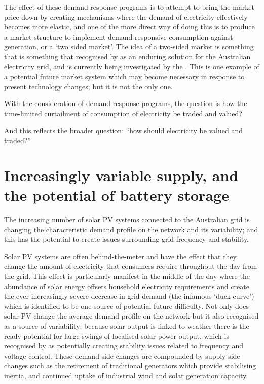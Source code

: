 The effect of these demand-response programs is to attempt to bring the market price down by creating mechanisms where the demand of electricity effectively becomes more elastic, and one of the more direct way of doing this is to produce a market structure to implement demand-responsive consumption against generation, or a `two sided market'.
The idea of a two-sided market is something that is something that recognised by \cite{australianenergymarketcommission2020} as an enduring solution for the Australian electricity grid, and is currently being investigated by the \cite{energysecurityboard2020}.
This is one example of a potential future market system which may become necessary in response to present technology changes; but it is not the only one.

With the consideration of demand response programs, the question is how the time-limited curtailment of consumption of electricity be traded and valued?

\noindent And this reflects the broader question: ``how should electricity be valued and traded?'' 

\section{Increasingly variable supply, and the potential of battery storage}\label{sec:intro_part12}

The increasing number of solar PV systems connected to the Australian grid is changing the characteristic demand profile on the network and its variability; and this has the potential to create issues surrounding grid frequency and stability.

Solar PV systems are often behind-the-meter and have the effect that they change the amount of electricity that consumers require throughout the day from the grid.
This effect is particularly manifest in the middle of the day where the abundance of solar energy offsets household electricity requirements and create the ever increasingly severe decrease in grid demand (the infamous `duck-curve') which is identified to be one source of potential future difficulty.
Not only does solar PV change the average demand profile on the network but it also recognised as a source of variability; because solar output is linked to weather there is the ready potential for large swings of localised solar power output, which is recognised by \cite{australianenergymarketoperatorlimited2018} as potentially creating stability issues related to frequency and voltage control.
These demand side changes are compounded by supply side changes such as the retirement of traditional generators which provide stabilising inertia, and continued uptake of industrial wind and solar generation capacity.


